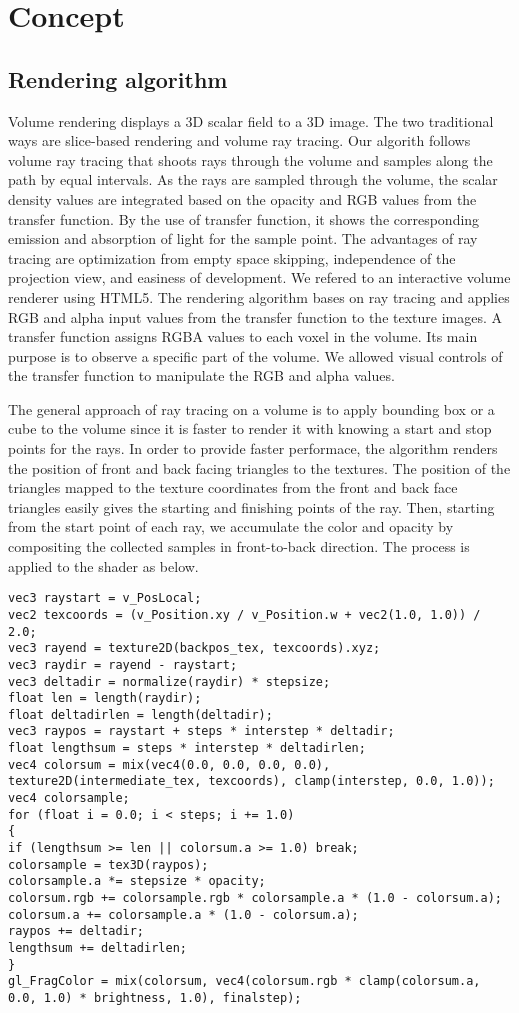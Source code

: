\documentclass{acm_proc_article-sp}
\begin{document}
\section{Concept}
\subsection{Rendering algorithm}

Volume rendering displays a 3D scalar field to a 3D image. The two traditional ways are slice-based rendering and volume ray tracing. Our algorith follows volume ray tracing that shoots rays through the volume and samples along the path by equal intervals. As the rays are sampled through the volume, the scalar density values are integrated based on the opacity and RGB values from the transfer function. By the use of transfer function, it shows the corresponding emission and absorption of light for the sample point. The advantages of ray tracing are optimization from empty space skipping, independence of the projection view, and easiness of development.
We refered to an interactive volume renderer using HTML5. The rendering algorithm bases on ray tracing and applies RGB and alpha input values from the transfer function to the texture images. A transfer function assigns RGBA values to each voxel in the volume. Its main purpose is to observe a specific part of the volume. We allowed visual controls of the transfer function to manipulate the RGB and alpha values. 

The general approach of ray tracing on a volume is to apply bounding box or a cube to the volume since it is faster to render it with knowing a start and stop points for the rays. In order to provide faster performace, the algorithm renders the position of front and back facing triangles to the textures. The position of the triangles mapped to the texture coordinates from the front and back face triangles easily gives the starting and finishing points of the ray. Then, starting from the start point of each ray, we accumulate the color and opacity by compositing the collected samples in front-to-back direction. The process is applied to the shader as below.

\begin{verbatim}
vec3 raystart = v_PosLocal;
vec2 texcoords = (v_Position.xy / v_Position.w + vec2(1.0, 1.0)) / 2.0;
vec3 rayend = texture2D(backpos_tex, texcoords).xyz;
vec3 raydir = rayend - raystart;
vec3 deltadir = normalize(raydir) * stepsize;
float len = length(raydir);
float deltadirlen = length(deltadir);
vec3 raypos = raystart + steps * interstep * deltadir;
float lengthsum = steps * interstep * deltadirlen;
vec4 colorsum = mix(vec4(0.0, 0.0, 0.0, 0.0), texture2D(intermediate_tex, texcoords), clamp(interstep, 0.0, 1.0));
vec4 colorsample;
for (float i = 0.0; i < steps; i += 1.0)
{
if (lengthsum >= len || colorsum.a >= 1.0) break;
colorsample = tex3D(raypos);
colorsample.a *= stepsize * opacity;
colorsum.rgb += colorsample.rgb * colorsample.a * (1.0 - colorsum.a);
colorsum.a += colorsample.a * (1.0 - colorsum.a);
raypos += deltadir;
lengthsum += deltadirlen;
}
gl_FragColor = mix(colorsum, vec4(colorsum.rgb * clamp(colorsum.a, 0.0, 1.0) * brightness, 1.0), finalstep);
\end{verbatim}
\end{document}
